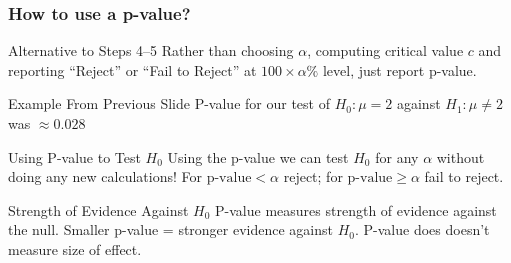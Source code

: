 \begin{frame}
  \frametitle{How to use a p-value?}

  \small

  \begin{block}{Alternative to Steps 4--5}
   Rather than choosing $\alpha$, computing critical value $c$ and reporting ``Reject'' or ``Fail to Reject'' at $100\times \alpha\%$ level, just report p-value.
  \end{block}

  \pause

  \begin{alertblock}{Example From Previous Slide}
    P-value for our test of $H_0\colon \mu = 2$ against $H_1\colon \mu \neq 2$ was $\approx 0.028$
  \end{alertblock}

  \pause

  \begin{block}{Using P-value to Test $H_0$}
    Using the p-value we can test $H_0$ for \alert{any} $\alpha$ without doing any new calculations!
    For $\mbox{p-value} < \alpha$ reject; for $\mbox{p-value} \geq \alpha$ fail to reject.

  \end{block}

  \pause

  \begin{block}{Strength of Evidence Against $H_0$}
    P-value measures \alert{strength of evidence against the null}.
    Smaller p-value = stronger evidence against $H_0$.
    P-value does \alert{doesn't} measure \alert{size} of effect.
  \end{block}

\end{frame}
